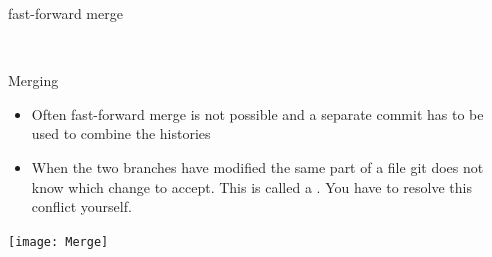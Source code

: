 \documentclass[12pt]{beamer}
\begin{document}
\begin{frame}{fast-forward merge}
	 \begin{figure}
 \begin{subfigure}[b]{\textwidth}
	\centering
\end{subfigure}
\\[3pt]
\begin{subfigure}[b]{\textwidth}
	\centering
\end{subfigure}
\end{figure}
\end{frame}

\begin{frame}[fragile]{Merging}
	\begin{itemize}
		\item Often fast-forward merge is not possible and a separate commit has to be used to combine the histories
		\item When the two branches have modified the same part of a file git does not know which change to accept. This is called a \textbf{}. You have to resolve this conflict yourself. 
	\end{itemize}
\end{frame}

\begin{frame}
	\begin{center}
		\texttt{[image: Merge]}
	\end{center}
\end{frame}
\end{document}
